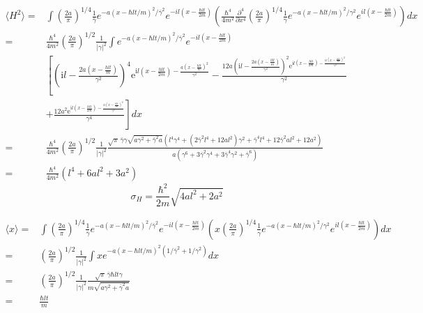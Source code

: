 \begin{align*}
    \langle H^2\rangle
    =&
    \int 
    \left(\frac{2a}{\pi}\right)^{1/4}
\frac{1}{\bar{\gamma}}
e^{-a(x-\hbar lt/m)^2/\bar{\gamma}^2}
e^{-il(x-\frac{\hbar lt}{2m})}
\left(
\frac{\hbar^4}{4m^2}
\frac{\partial^4}{\partial x^4}
\left(\frac{2a}{\pi}\right)^{1/4}
\frac{1}{\gamma}
e^{-a(x-\hbar lt/m)^2/\gamma^2}
e^{il(x-\frac{\hbar lt}{2m})}
\right)dx\\
=&\frac{\hbar^4}{4m^2}\left(\frac{2a}{\pi}\right)^{1/2}
\frac{1}{|\gamma|^2}
\int
e^{-a(x-\hbar lt/m)^2/\bar{\gamma}^2}
e^{-il(x-\frac{hlt}{2m})}\\
&
\left[
\left(\mathrm{i}l - \frac{2a \left(x - \frac{hlt}{m}\right)}{{\gamma}^{2}}\right)^{4} \mathrm{e}^{\mathrm{i}l \left(x - \frac{hlt}{2m}\right) - \frac{a \left(x - \frac{hlt}{m}\right)^{2}}{{\gamma}^{2}}} - \frac{12a \left(\mathrm{i}l - \frac{2a \left(x - \frac{hlt}{m}\right)}{{\gamma}^{2}}\right)^{2} \mathrm{e}^{\mathrm{i}l \left(x - \frac{hlt}{2m}\right) - \frac{a \left(x - \frac{hlt}{m}\right)^{2}}{{\gamma}^{2}}}}{{\gamma}^{2}}\right.\\
&\left.+ \frac{12a^{2} \mathrm{e}^{\mathrm{i}l \left(x - \frac{hlt}{2m}\right) - \frac{a \left(x - \frac{hlt}{m}\right)^{2}}{{\gamma}^{2}}}}{{\gamma}^{4}}
\right]dx\\
=&
\frac{\hbar^4}{4m^2}\left(\frac{2a}{\pi}\right)^{1/2}
\frac{1}{|\gamma|^2}
\frac{\sqrt{\pi} \, \bar{\gamma}{\gamma} \sqrt{a{\gamma}^{2} + \bar{\gamma}^{2} a} \left(l^{4} {\gamma}^{4} + \left(2\bar{\gamma}^{2} l^{4} + 12al^{2}\right) {\gamma}^{2} + \bar{\gamma}^{4} l^{4} + 12\bar{\gamma}^{2} al^{2} + 12a^{2}\right)}{a \left({\gamma}^{6} + 3\bar{\gamma}^{2} {\gamma}^{4} + 3\bar{\gamma}^{4} {\gamma}^{2} + \bar{\gamma}^{6}\right)}
\\
=&
\frac{\hbar^4}{4m^2}
(l^4+6al^2+3a^2)
\end{align*}
$$
\sigma_H=\frac{\hbar^2}{2m}\sqrt{4al^2+2a^2}
$$


\begin{align*}
    \langle x\rangle
    =&
    \int 
    \left(\frac{2a}{\pi}\right)^{1/4}
\frac{1}{\bar{\gamma}}
e^{-a(x-\hbar lt/m)^2/\bar{\gamma}^2}
e^{-il(x-\frac{\hbar lt}{2m})}
\left(
x
\left(\frac{2a}{\pi}\right)^{1/4}
\frac{1}{\gamma}
e^{-a(x-\hbar lt/m)^2/\gamma^2}
e^{il(x-\frac{\hbar lt}{2m})}
\right)dx\\
=&
\left(\frac{2a}{\pi}\right)^{1/2}
\frac{1}{|\gamma|^2}
\int x
e^{-a(x-\hbar lt/m)^2(1/\bar{\gamma}^2+1/\gamma^2)}dx\\
=&
\left(\frac{2a}{\pi}\right)^{1/2}
\frac{1}{|\gamma|^2}
\frac{\sqrt{\pi} \, \bar{\gamma}\hbar lt{\gamma}}{m \sqrt{a{\gamma}^{2} + \bar{\gamma}^{2} a}}\\
=&
\frac{\hbar lt}{m }
\end{align*}

